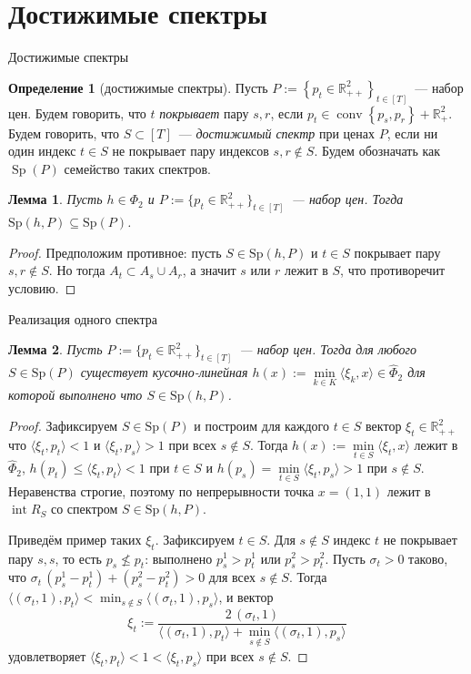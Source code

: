 \documentclass[10pt,aspectratio=169]{beamer}
\theoremstyle{plain}
\newtheorem{lem}{Лемма}
\theoremstyle{definition}
\newtheorem{defn}{Определение}
\newcommand{\R}{\mathbb{R}}
\newcommand{\set}[1]{\left\{ #1 \right\}}
\newcommand{\ip}[2]{\langle #1, #2\rangle}
\newcommand{\Rpp}[1][2]{\R^{#1}_{++}}
\newcommand{\Rp}[1][2]{\R^{#1}_{+}}
\DeclareMathOperator{\conv}{conv}
\DeclareMathOperator{\interior}{int}
\DeclareMathOperator{\Sp}{Sp}
\begin{document}
\section{Достижимые спектры}

\begin{frame}{Достижимые спектры}
    \begin{defn}[достижимые спектры]
        Пусть $P:=\set{p_t\in\Rpp}_{t\in[T]}$~--- набор цен. Будем говорить, что $t$ \emph{покрывает} пару $s,r$, если $p_t\in\conv\set{p_s,p_r}+\Rp$. Будем говорить, что $S\subset[T]$~--- \emph{достижимый спектр} при ценах $P$, если ни один индекс $t\in S$ не покрывает пару индексов $s,r\notin S$. Будем обозначать как $\Sp(P)$ семейство таких спектров.
    \end{defn}

    \begin{lem}\label{lem:reach-nec}
        Пусть $h\in\Phi_{2}$ и $P:=\{p_{t}\in\Rpp\}_{t\in[T]}$~--- набор цен. Тогда $\mathrm{Sp}(h,P)\subseteq\mathrm{Sp}(P)$.
    \end{lem}

    \begin{proof}
        Предположим противное: пусть $S\in\mathrm{Sp}(h,P)$ и $t\in S$ покрывает пару $s,r\notin S$. Но тогда $A_{t}\subset A_{s}\cup A_{r}$, а значит $s$ или $r$ лежит в $S$, что противоречит условию.
    \end{proof}
\end{frame}

\begin{frame}{Реализация одного спектра}
    \begin{lem}\label{lem:one}
        Пусть $P:=\{p_{t}\in\Rpp\}_{t\in[T]}$~--- набор цен. Тогда для любого $S\in\mathrm{Sp}(P)$ существует кусочно-линейная $h(x):=\min\limits_{k\in K}\langle\xi_{k}, x\rangle\in\hat\Phi_{2}$ для которой выполнено что $S\in\mathrm{Sp}(h,P)$.
    \end{lem}

    \begin{proof}
        Зафиксируем $S\in\mathrm{Sp}(P)$ и построим для каждого $t\in S$ вектор $\xi_t\in\Rpp$ что $\ip{\xi_t}{p_t}<1$ и $\ip{\xi_t}{p_s}>1$ при всех $s\notin S$. Тогда $h(x):=\min\limits_{t\in S}\ip{\xi_t}{x}$ лежит в $\hat\Phi_2$, $h(p_t)\le\ip{\xi_t}{p_t}<1$ при $t\in S$ и $h(p_s)=\min\limits_{t\in S}\ip{\xi_t}{p_s}>1$ при $s\notin S$. Неравенства строгие, поэтому по непрерывности точка $x=(1,1)$ лежит в $\interior R_{S}$ со спектром $S\in\mathrm{Sp}(h,P)$.

        Приведём пример таких $\xi_t$. Зафиксируем $t\in S$. Для $s\notin S$ индекс $t$ не покрывает пару $s,s$, то есть $p_s\not\le p_t$: выполнено $p^1_s>p^1_t$ или $p^2_s>p^2_t$. Пусть $\sigma_t>0$ таково, что $\sigma_t\,(p^1_s-p^1_t)+(p^2_s-p^2_t)>0$ для всех $s\notin S$. Тогда $\ip{(\sigma_t,1)}{p_t}<\min_{s\notin S}\ip{(\sigma_t,1)}{p_s}$, и вектор
        \[
            \xi_t:=\frac{2\,(\sigma_t,1)}{\ip{(\sigma_t,1)}{p_t}+\min_{s\notin S}\ip{(\sigma_t,1)}{p_s}}
        \]
        удовлетворяет $\ip{\xi_t}{p_t}<1<\ip{\xi_t}{p_s}$ при всех $s\notin S$.
    \end{proof}
\end{frame}
\end{document}
